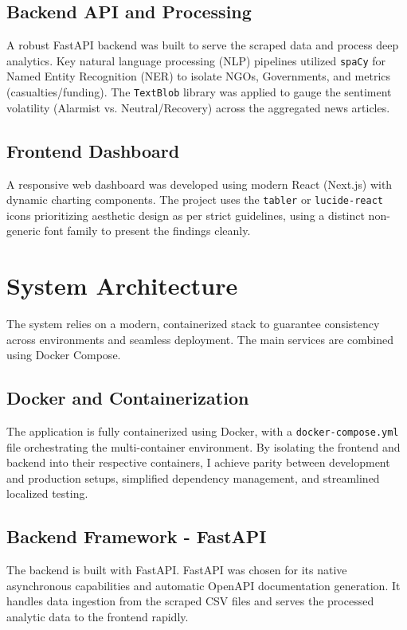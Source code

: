\documentclass[11pt,a4paper]{article}
\begin{document}
\subsection{Backend API and Processing}
A robust FastAPI backend was built to serve the scraped data and process deep analytics. Key natural language processing (NLP) pipelines utilized \texttt{spaCy} for Named Entity Recognition (NER) to isolate NGOs, Governments, and metrics (casualties/funding). The \texttt{TextBlob} library was applied to gauge the sentiment volatility (Alarmist vs. Neutral/Recovery) across the aggregated news articles.

\subsection{Frontend Dashboard}
A responsive web dashboard was developed using modern React (Next.js) with dynamic charting components. The project uses the \texttt{tabler} or \texttt{lucide-react} icons prioritizing aesthetic design as per strict guidelines, using a distinct non-generic font family to present the findings cleanly.

\section{System Architecture}
The system relies on a modern, containerized stack to guarantee consistency across environments and seamless deployment. The main services are combined using Docker Compose.

\subsection{Docker and Containerization}
The application is fully containerized using Docker, with a \texttt{docker-compose.yml} file orchestrating the multi-container environment. By isolating the frontend and backend into their respective containers, I achieve parity between development and production setups, simplified dependency management, and streamlined localized testing.

\subsection{Backend Framework - FastAPI}
The backend is built with FastAPI. FastAPI was chosen for its native asynchronous capabilities and automatic OpenAPI documentation generation. It handles data ingestion from the scraped CSV files and serves the processed analytic data to the frontend rapidly. 
\end{document}
